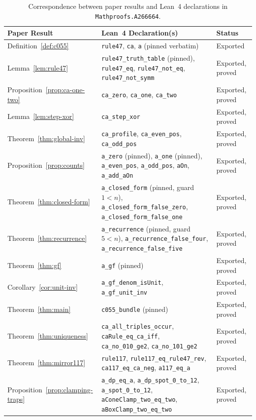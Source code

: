 \documentclass[11pt]{article}
\theoremstyle{definition}
\begin{document}
\begin{table}[ht]
\centering
\caption{Correspondence between paper results and Lean~4 declarations in \nolinkurl{Mathproofs.A266664}.}
\label{tab:lean-map}
\smallskip
{\small
\begin{tabular}{@{}l >{\raggedright\arraybackslash}p{8.2cm} l@{}}
\toprule
Paper Result & Lean~4 Declaration(s) & Status \\
\midrule
Definition~\ref{def:c055} & \texttt{rule47}, \texttt{ca}, \texttt{a} (pinned verbatim) & Exported \\
Lemma~\ref{lem:rule47} & \texttt{rule47\_truth\_table} (pinned), \texttt{rule47\_eq}, \texttt{rule47\_not\_eq}, \texttt{rule47\_not\_symm} & Exported, proved \\
Proposition~\ref{prop:ca-one-two} & \texttt{ca\_zero}, \texttt{ca\_one}, \texttt{ca\_two} & Exported, proved \\
Lemma~\ref{lem:step-xor} & \texttt{ca\_step\_xor} & Exported, proved \\
Theorem~\ref{thm:global-inv} & \texttt{ca\_profile}, \texttt{ca\_even\_pos}, \texttt{ca\_odd\_pos} & Exported, proved \\
Proposition~\ref{prop:counts} & \texttt{a\_zero} (pinned), \texttt{a\_one} (pinned), \texttt{a\_even\_pos}, \texttt{a\_odd\_pos}, \texttt{aOn}, \texttt{a\_add\_aOn} & Exported, proved \\
Theorem~\ref{thm:closed-form} & \texttt{a\_closed\_form} (pinned, guard $1 < n$), \texttt{a\_closed\_form\_false\_zero}, \texttt{a\_closed\_form\_false\_one} & Exported, proved \\
Theorem~\ref{thm:recurrence} & \texttt{a\_recurrence} (pinned, guard $5 < n$), \texttt{a\_recurrence\_false\_four}, \texttt{a\_recurrence\_false\_five} & Exported, proved \\
Theorem~\ref{thm:gf} & \texttt{a\_gf} (pinned) & Exported, proved \\
Corollary~\ref{cor:unit-inv} & \texttt{a\_gf\_denom\_isUnit}, \texttt{a\_gf\_unit\_inv} & Exported, proved \\
Theorem~\ref{thm:main} & \texttt{c055\_bundle} (pinned) & Exported, proved \\
Theorem~\ref{thm:uniqueness} & \texttt{ca\_all\_triples\_occur}, \texttt{caRule\_eq\_ca\_iff}, \texttt{ca\_no\_010\_ge2}, \texttt{ca\_no\_101\_ge2} & Exported, proved \\
Theorem~\ref{thm:mirror117} & \texttt{rule117}, \texttt{rule117\_eq\_rule47\_rev}, \texttt{ca117\_eq\_ca\_neg}, \texttt{a117\_eq\_a} & Exported, proved \\
Proposition~\ref{prop:clamping-traps} & \texttt{a\_dp\_eq\_a}, \texttt{a\_dp\_spot\_0\_to\_12}, \texttt{a\_spot\_0\_to\_12}, \texttt{aConeClamp\_two\_eq\_two}, \texttt{aBoxClamp\_two\_eq\_two} & Exported, proved \\
\bottomrule
\end{tabular}
}
\end{table}
\end{document}
